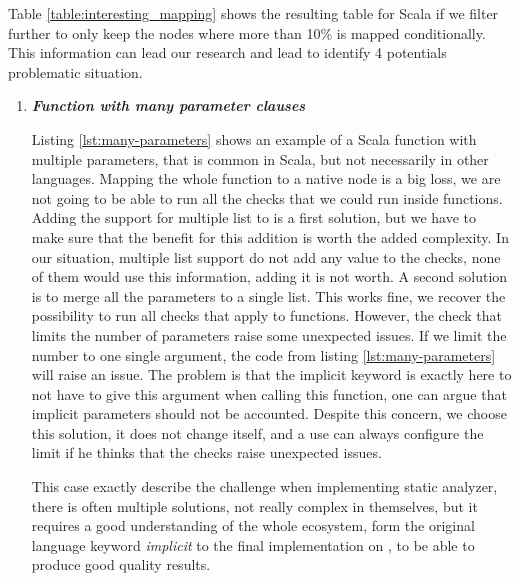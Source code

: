Table \ref{table:interesting_mapping} shows the resulting table for Scala if we filter further to only keep the nodes where more than 10\% is mapped conditionally. 
This information can lead our research and lead to identify 4 potentials problematic situation.

\begin{enumerate}
	\item \textbf{\textit{Function with many parameter clauses}} \newline 
	
	
	Listing \ref{lst:many-parameters} shows an example of a Scala function with multiple parameters, that is common in Scala, but not necessarily in other languages. 
	Mapping the whole function to a native node is a big loss, we are not going to be able to run all the checks that we could run inside functions.
	Adding the support for multiple list to \slang{} is a first solution, but we have to make sure that the benefit for this addition is worth the added complexity.
	In our situation, multiple list support do not add any value to the checks, none of them would use this information, adding it is not worth.
	A second solution is to merge all the parameters to a single list.
	This works fine, we recover the possibility to run all checks that apply to functions.
	However, the check that limits the number of parameters raise some unexpected issues.
	If we limit the number to one single argument, the code from listing \ref{lst:many-parameters} will raise an issue.
	The problem is that the implicit keyword is exactly here to not have to give this argument when calling this function, one can argue that implicit parameters should not be accounted.
	Despite this concern, we choose this solution, it does not change \slang{} itself, and a use can always configure the limit if he thinks that the checks raise unexpected issues.
	
	This case exactly describe the challenge when implementing static analyzer, there is often multiple solutions, not really complex in themselves, but it requires a good understanding of the whole ecosystem, form the original language keyword \emph{implicit} to the final implementation on \slang{}, to be able to produce good quality results.
	

\end{enumerate}
